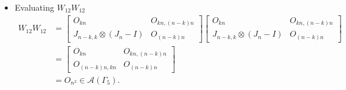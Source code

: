 \begin{itemize}
\item Evaluating $W_{12}W_{12}$
\begin{align*}
    W_{12}W_{12}
    &= \begin{bmatrix}
        O_{kn} & O_{kn, (n-k)n} \\
        J_{n-k, k}\otimes (J_n-I) & O_{(n-k)n}
    \end{bmatrix}
    \begin{bmatrix}
        O_{kn} & O_{kn, (n-k)n} \\
        J_{n-k, k}\otimes (J_n-I) & O_{(n-k)n}
    \end{bmatrix}\\
    &= \begin{bmatrix}
        O_{kn} & O_{kn, (n-k)n} \\
        O_{(n-k)n,kn} & O_{(n - k)n}
    \end{bmatrix}\\
    &= O_{n^2} \in\mathcal{A}(\Gamma_5).
\end{align*}
\end{itemize}





